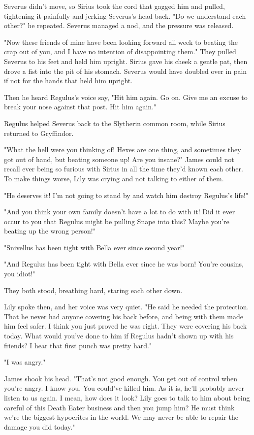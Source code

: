\documentclass[a4paper,11pt]{article}
\begin{document}
Severus didn't move, so Sirius took the cord that gagged him and pulled, tightening it painfully and jerking Severus's head back. "Do we understand each other?" he repeated. Severus managed a nod, and the pressure was released.

"Now these friends of mine have been looking forward all week to beating the crap out of you, and I have no intention of disappointing them." They pulled Severus to his feet and held him upright. Sirius gave his cheek a gentle pat, then drove a fist into the pit of his stomach. Severus would have doubled over in pain if not for the hands that held him upright.

Then he heard Regulus's voice say, "Hit him again. Go on. Give me an excuse to break your nose against that post. Hit him again."

Regulus helped Severus back to the Slytherin common room, while Sirius returned to Gryffindor.

"What the hell were you thinking of! Hexes are one thing, and sometimes they got out of hand, but beating someone up! Are you insane?" James could not recall ever being so furious with Sirius in all the time they'd known each other. To make things worse, Lily was crying and not talking to either of them.

"He deserves it! I'm not going to stand by and watch him destroy Regulus's life!"

"And you think your own family doesn't have a lot to do with it! Did it ever occur to you that Regulus might be pulling Snape into this? Maybe you're beating up the wrong person!"

"Snivellus has been tight with Bella ever since second year!"

"And Regulus has been tight with Bella ever since he was born! You're cousins, you idiot!"

They both stood, breathing hard, staring each other down.

Lily spoke then, and her voice was very quiet. "He said he needed the protection. That he never had anyone covering his back before, and being with them made him feel safer. I think you just proved he was right. They were covering his back today. What would you've done to him if Regulus hadn't shown up with his friends? I hear that first punch was pretty hard."

"I was angry."

James shook his head. "That's not good enough. You get out of control when you're angry. I know you. You could've killed him. As it is, he'll probably never listen to us again. I mean, how does it look? Lily goes to talk to him about being careful of this Death Eater business and then you jump him? He must think we're the biggest hypocrites in the world. We may never be able to repair the damage you did today."
\end{document}
